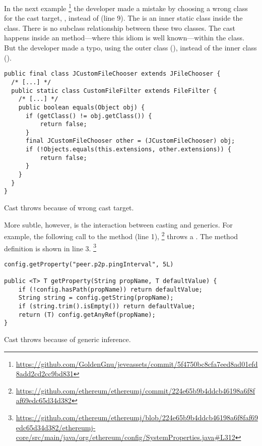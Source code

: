 In the next example%
\footnote{\url{https://github.com/GoldenGnu/jeveassets/commit/5f4750bc8cfa7eed8ad01efd8add2cd2cc9bd831}}
the developer made a mistake by choosing a wrong class for the cast target,
\ie,  instead of  (line 9).
The  is an inner static class inside the  class.
There is no subclass relationship between these two classes.
The cast happens inside an  method---where this idiom is well known---within the  class.
But the developer made a typo, using the outer class (), instead of the inner class ().

\begin{listing}
\begin{verbatim}
public final class JCustomFileChooser extends JFileChooser {
  /* [...] */
  public static class CustomFileFilter extends FileFilter {
    /* [...] */
    public boolean equals(Object obj) {
      if (getClass() != obj.getClass()) {
          return false;
      }
      final JCustomFileChooser other = (JCustomFileChooser) obj;
      if (!Objects.equals(this.extensions, other.extensions)) {
          return false;
      }
    }
  }
}
\end{verbatim} 
\caption{Cast throws  because of wrong cast target.}
\end{listing}

More subtle, however, is the interaction between casting and generics.
For example, the following call to the  method (line 1),%
\footnote{\url{https://github.com/ethereum/ethereumj/commit/224e65b9b4ddcb46198a6f8faf69edc65d34d382}}
throws a .
The method definition is shown in line 3.%
\footnote{\url{https://github.com/ethereum/ethereumj/blob/224e65b9b4ddcb46198a6f8faf69edc65d34d382/ethereumj-core/src/main/java/org/ethereum/config/SystemProperties.java\#L312}}

\begin{listing}
\begin{verbatim}
config.getProperty("peer.p2p.pingInterval", 5L)

public <T> T getProperty(String propName, T defaultValue) {
    if (!config.hasPath(propName)) return defaultValue;
    String string = config.getString(propName);
    if (string.trim().isEmpty()) return defaultValue;
    return (T) config.getAnyRef(propName);
}
\end{verbatim}
\caption{Cast throws  because of generic inference.}
\end{listing}

